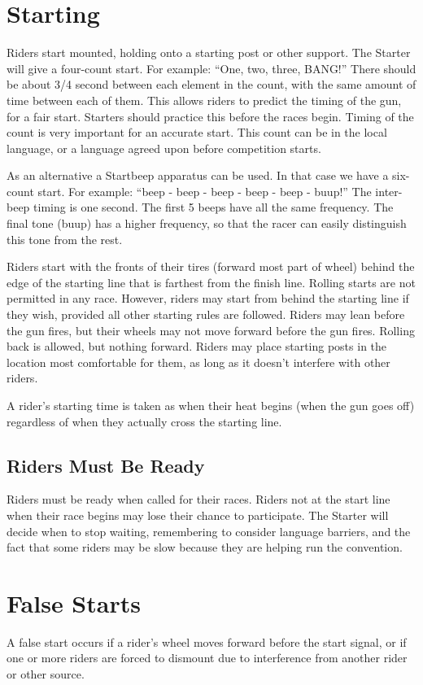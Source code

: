 \section{Starting}
Riders start mounted, holding onto a starting post or other support.
The Starter will give a four-count start.
For example: ``One, two, three, BANG!''
There should be about 3/4 second between each element in the count, with the same amount of time between each of them.
This allows riders to predict the timing of the gun, for a fair start.
Starters should practice this before the races begin.
Timing of the count is very important for an accurate start.
This count can be in the local language, or a language agreed upon before competition starts.

As an alternative a Startbeep apparatus can be used.
In that case we have a six-count start.
For example: ``beep - beep - beep - beep - beep - buup!''
The inter-beep timing is one second.
The first 5 beeps have all the same frequency.
The final tone (buup) has a higher frequency, so that the racer can easily distinguish this tone from the rest.

Riders start with the fronts of their tires (forward most part of wheel) behind the edge of the starting line that is farthest from the finish line.
Rolling starts are not permitted in any race.
However, riders may start from behind the starting line if they wish, provided all other starting rules are followed.
Riders may lean before the gun fires, but their wheels may not move forward before the gun fires.
Rolling back is allowed, but nothing forward.
Riders may place starting posts in the location most comfortable for them, as long as it doesn't interfere with other riders.

A rider’s starting time is taken as when their heat begins (when the gun goes off) regardless of when they actually cross the starting line.
\subsection{Riders Must Be Ready}
Riders must be ready when called for their races.
Riders not at the start line when their race begins may lose their chance to participate.
The Starter will decide when to stop waiting, remembering to consider language barriers, and the fact that some riders may be slow because they are helping run the convention.

\section{False Starts}
A false start occurs if a rider's wheel moves forward before the start signal, or if one or more riders are forced to dismount due to interference from another rider or other source.

